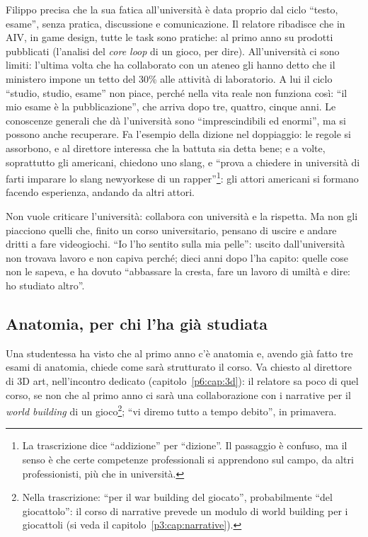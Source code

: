 Filippo precisa che la sua fatica all'università è data proprio dal ciclo
``testo, esame'', senza pratica, discussione e comunicazione. Il relatore
ribadisce che in AIV, in game design, tutte le task sono pratiche: al primo
anno su prodotti pubblicati (l'analisi del \emph{core loop} di un gioco, per
dire). All'università ci sono limiti: l'ultima volta che ha collaborato con
un ateneo gli hanno detto che il ministero impone un tetto del 30\% alle
attività di laboratorio. A lui il ciclo ``studio, studio, esame'' non
piace, perché nella vita reale non funziona così: ``il mio esame è la
pubblicazione'', che arriva dopo tre, quattro, cinque anni. Le conoscenze
generali che dà l'università sono ``imprescindibili ed enormi'', ma si
possono anche recuperare. Fa l'esempio della dizione nel doppiaggio: le
regole si assorbono, e al direttore interessa che la battuta sia detta bene;
e a volte, soprattutto gli americani, chiedono uno slang, e ``prova a
chiedere in università di farti imparare lo slang newyorkese di un
rapper''\footnote{La trascrizione dice ``addizione'' per ``dizione''. Il
passaggio è confuso, ma il senso è che certe competenze professionali si
apprendono sul campo, da altri professionisti, più che in università.}: gli
attori americani si formano facendo esperienza, andando da altri attori.

Non vuole criticare l'università: collabora con università e la rispetta. Ma
non gli piacciono quelli che, finito un corso universitario, pensano di
uscire e andare dritti a fare videogiochi. ``Io l'ho sentito sulla mia
pelle'': uscito dall'università non trovava lavoro e non capiva perché;
dieci anni dopo l'ha capito: quelle cose non le sapeva, e ha dovuto
``abbassare la cresta, fare un lavoro di umiltà e dire: ho studiato
altro''.

\subsection{Anatomia, per chi l'ha già studiata}

Una studentessa ha visto che al primo anno c'è anatomia e, avendo già fatto
tre esami di anatomia, chiede come sarà strutturato il corso. Va chiesto al
direttore di 3D art, nell'incontro dedicato (capitolo~\ref{p6:cap:3d}): il
relatore sa poco di quel corso, se non che al primo anno ci sarà una
collaborazione con i narrative per il \emph{world building} di un
gioco\footnote{Nella trascrizione: ``per il war building del giocato'',
probabilmente ``del giocattolo'': il corso di narrative prevede un modulo
di world building per i giocattoli (si veda il capitolo~\ref{p3:cap:narrative}).};
``vi diremo tutto a tempo debito'', in primavera.

